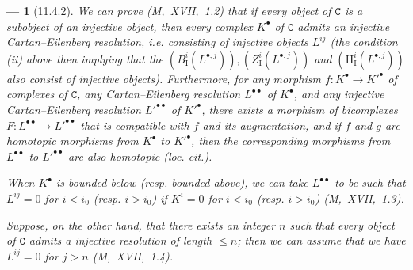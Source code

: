 \documentclass[oneside]{amsart}
\theoremstyle{ega-env-style}
\newtheorem*{env}{---}
\theoremstyle{ega-thm-env-style}
\theoremstyle{ega-defn-env-style}
\def\cat{\mathtt}                   %
\def\leq{\leqslant}                 %
\def\HH{\mathrm{H}}                 %
\begin{document}
\begin{env}[11.4.2]
We can prove (M,~XVII,~1.2) that if every object of $\cat{C}$ is a subobject of an injective object, then every complex $K^\bullet$ of $\cat{C}$ admits an \emph{injective} Cartan--Eilenberg resolution, i.e. consisting of injective objects $L^{ij}$ (the condition (ii) above then implying that the $(B_\mathrm{I}^i(L^{\bullet,j})), (Z_\mathrm{I}^i(L^{\bullet,j}))$ and $(\HH_\mathrm{I}^i(L^{\bullet,j}))$ also consist of injective objects).
Furthermore, for any morphism $f: K^\bullet \rightarrow K'^\bullet$ of complexes of $\cat{C}$, 
any Cartan--Eilenberg resolution $L^{\bullet\bullet}$ of $K^\bullet$, and any \emph{injective} Cartan--Eilenberg resolution $L'^{\bullet\bullet}$ of $K'^\bullet$, there exists a morphism of bicomplexes $F: L^{\bullet\bullet} \rightarrow L'^{\bullet\bullet}$ that is compatible with $f$ and its augmentation, and if $f$ and $g$ are homotopic morphisms from $K^\bullet$ to $K'^\bullet$, then the corresponding morphisms from $L^{\bullet\bullet}$ to $L'^{\bullet\bullet}$ are also homotopic \emph{(loc. cit.)}.

When $K^{\bullet}$ is \emph{bounded below} (resp. \emph{bounded above}), we can take $L^{\bullet\bullet}$ to be such that $L^{ij}=0$ for $i<i_0$ (resp. $i>i_0$) if $K^i=0$ for $i<i_0$ (resp. $i>i_0$) (M,~XVII,~1.3).

Suppose, on the other hand, that there exists an integer $n$ such that every object of $\cat{C}$ admits a \emph{injective resolution of length $\leq n$};
then we can assume that we have $L^{ij}=0$ for $j>n$ (M,~XVII,~1.4).
\end{env}
\end{document}
